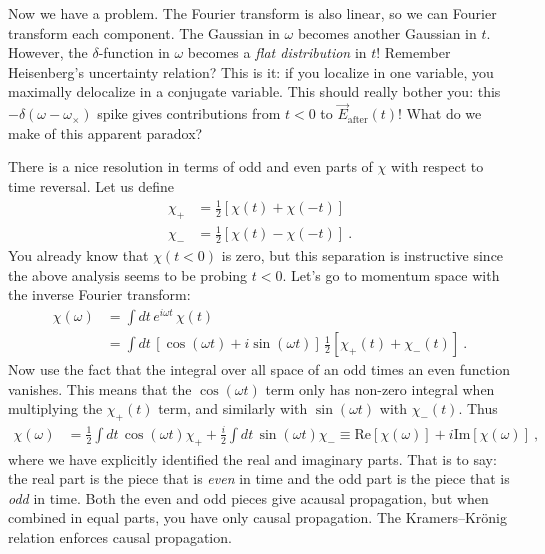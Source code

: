 Now we have a problem. The Fourier transform is also linear, so we can Fourier transform each component. The Gaussian in $\omega$ becomes another Gaussian in $t$. However, the $\delta$-function in $\omega$ becomes a \emph{flat distribution} in $t$! Remember Heisenberg's uncertainty relation? This is it: if you localize in one variable, you maximally delocalize in a conjugate variable. This should really bother you: this $-\delta(\omega-\omega_\times)$ spike gives contributions from $t<0$ to $\vec{E}_\text{after}(t)$! What do we make of this apparent paradox?


There is a nice resolution in terms of odd and even parts of $\chi$ with respect to time reversal. Let us define
\begin{align}
	\chi_+ &= \frac{1}{2}\left[\chi(t) + \chi(-t)\right]
	\\
	\chi_- &= \frac{1}{2}\left[\chi(t) - \chi(-t)\right] \ .
\end{align}
You already know that $\chi(t<0)$ is zero, but this separation is instructive since the above analysis seems to be probing $t<0$. Let's go to momentum space with the inverse Fourier transform:
\begin{align}
	\chi(\omega) &= \int dt\,  e^{i\omega t} \, \chi(t)
	\\
	&=
	\int dt\,  \left[\cos(\omega t)+i\sin(\omega t)\right] 
	\, \frac{1}{2}\left[\chi_+(t)+ \chi_-(t)\right] \ .
\end{align}
Now use the fact that the integral over all space of an odd times an even function vanishes. This means that the $\cos(\omega t)$ term only has non-zero integral when multiplying the $\chi_+(t)$ term, and similarly with $\sin(\omega t)$ with $\chi_-(t)$. Thus
\begin{align}
	\chi(\omega) &= 
	\frac{1}{2}\int dt\, 
	\cos(\omega t) \chi_+
	+
	\frac{i}{2}\int dt\, 
	\sin(\omega t) \chi_-
	\equiv
	\text{Re}[\chi(\omega)]
	+i
	\text{Im}[\chi(\omega)] \ ,
\end{align}
where we have explicitly identified the real and imaginary parts. That is to say: the real part is the piece that is \emph{even} in time and the odd part is the piece that is \emph{odd} in time. Both the even and odd pieces give acausal propagation, but when combined in equal parts, you have only causal propagation. The Kramers--Kr\"onig relation enforces causal propagation.

